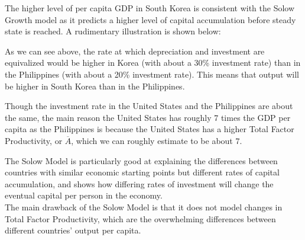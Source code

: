 \documentclass[8pt]{extarticle}
\begin{document}
\begin{solution}
  \begin{tcolorbox}[colframe = black!75!white, title = (a), colback = white]
      The higher level of per capita GDP in South Korea is consistent with the Solow Growth model as it predicts a higher level of capital accumulation before steady state is reached. A rudimentary illustration is shown below:
      \begin{center}
  \end{center}
  As we can see above, the rate at which depreciation and investment are equivalized would be higher in Korea (with about a 30\% investment rate) than in the Philippines (with about a 20\% investment rate). This means that output will be higher in South Korea than in the Philippines. 
\end{tcolorbox} 
  \begin{tcolorbox}[colframe = black!75!white, title = (b), colback = white]
    Though the investment rate in the United States and the Philippines are about the same, the main reason the United States has roughly 7 times the GDP per capita as the Philippines is because the United States has a higher Total Factor Productivity, or $\overline{A}$, which we can roughly estimate to be about $7$.
  \end{tcolorbox}
  \begin{tcolorbox}[colframe = black!75!white, title = (c), colback = white]
    The Solow Model is particularly good at explaining the differences between countries with similar economic starting points but different rates of capital accumulation, and shows how differing rates of investment will change the eventual capital per person in the economy.\\

    The main drawback of the Solow Model is that it does not model changes in Total Factor Productivity, which are the overwhelming differences between different countries' output per capita.
  \end{tcolorbox}
\end{solution}
\end{document}
